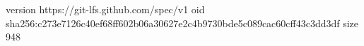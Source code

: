 version https://git-lfs.github.com/spec/v1
oid sha256:c273e7126c40ef68ff602b06a30627e2c4b9730bde5c089cac60cff43c3dd3df
size 948
